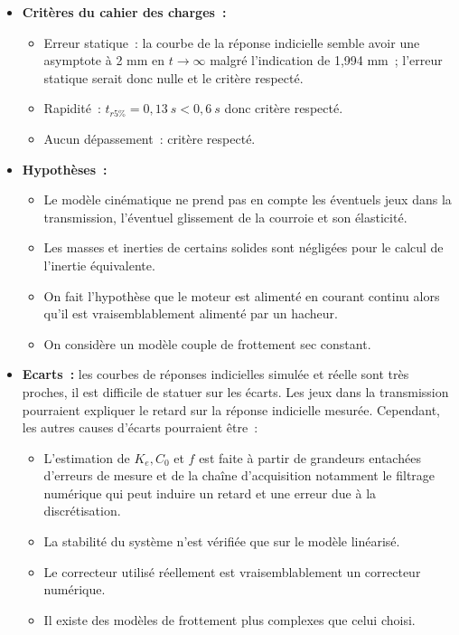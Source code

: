 \begin{texteCache}
\begin{itemize}
\item
  \textbf{Critères du cahier des charges~:}

  \begin{itemize}
  \item
    Erreur statique~: la courbe de la réponse indicielle semble avoir
    une asymptote à 2 mm en \(t \rightarrow \infty\) malgré l'indication
    de 1,994 mm~; l'erreur statique serait donc nulle et le critère
    respecté.
  \item
    Rapidité~: \(t_{r5\%} = 0,13\ s < 0,6\ s\) donc critère respecté.
  \item
    Aucun dépassement~: critère respecté.
  \end{itemize}
\item
  \textbf{Hypothèses~:}

  \begin{itemize}
  \item
    Le modèle cinématique ne prend pas en compte les éventuels jeux dans
    la transmission, l'éventuel glissement de la courroie et son
    élasticité.
  \item
    Les masses et inerties de certains solides sont négligées pour le
    calcul de l'inertie équivalente.
  \item
    On fait l'hypothèse que le moteur est alimenté en courant continu
    alors qu'il est vraisemblablement alimenté par un hacheur.
  \item
    On considère un modèle couple de frottement sec constant.
  \end{itemize}
\item
  \textbf{Ecarts~:} les courbes de réponses indicielles simulée et réelle sont
  très proches, il est difficile de statuer sur les écarts. Les jeux
  dans la transmission pourraient expliquer le retard sur la réponse
  indicielle mesurée. Cependant, les autres causes d'écarts pourraient
  être~:

  \begin{itemize}
  \item
    L'estimation de \(K_{e},C_{0}\) et \(f\) est faite à partir de
    grandeurs entachées d'erreurs de mesure et de la chaîne
    d'acquisition notamment le filtrage numérique qui peut induire un
    retard et une erreur due à la discrétisation.
  \item
    La stabilité du système n'est vérifiée que sur le modèle linéarisé.
  \item
    Le correcteur utilisé réellement est vraisemblablement un correcteur
    numérique.
  \item
    Il existe des modèles de frottement plus complexes que celui choisi.
  \end{itemize}
\end{itemize}

\end{texteCache}





